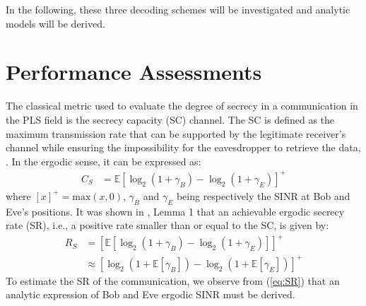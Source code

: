 \documentclass[journal,comsoc]{IEEEtran}
\let\MYoriglatexcaption\caption
\renewcommand{\caption}[2][\relax]{\MYoriglatexcaption[#2]{#2}}
\newcommand{\EX}[1]{\mathbb{E} \left[#1\right]}%
\begin{document}
In the following, these three decoding schemes will be investigated and analytic models will be derived.




%
%
%










\section{Performance Assessments}
\label{sec:perf}
The classical metric used to evaluate the degree of secrecy in a communication in the PLS field is the secrecy capacity (SC)  channel. The SC is defined as the maximum transmission rate that can be supported by the legitimate receiver's channel while ensuring the impossibility for the eavesdropper to retrieve the data, \cite{7348007}. In the ergodic sense, it can be expressed as:
\begin{equation}
\begin{split}
C_S &=  \EX{\log_2{\left(1+\gamma_B\right)} - \log_2{\left(1+\gamma_E\right)}}^+ 
\end{split}
\label{eq:SR}
\end{equation}
where $\left[x\right]^+ = \text{max}(x,0)$,  $\gamma_B$ and $\gamma_E$ being respectively the SINR at Bob and Eve's positions.  It was shown in \cite{8418798}, Lemma 1 that an achievable ergodic secrecy rate (SR), i.e., a positive rate smaller than or equal to the SC, is given by:
\begin{equation}
	\begin{split}
		R_S& = \left[\EX{\log_2(1+\gamma_B)-\log_2(1+\gamma_E)}\right]^+ \\
		& \approx \left[ \log_2(1 + \EX{\gamma_B}) - \log_2(1 + \EX{\gamma_E})\right]^+
	\end{split}
	\label{eq:SR2}
\end{equation}
To estimate the SR of the communication, we observe from (\ref{eq:SR}) that an analytic expression of Bob and Eve ergodic SINR must be derived.
\end{document}
